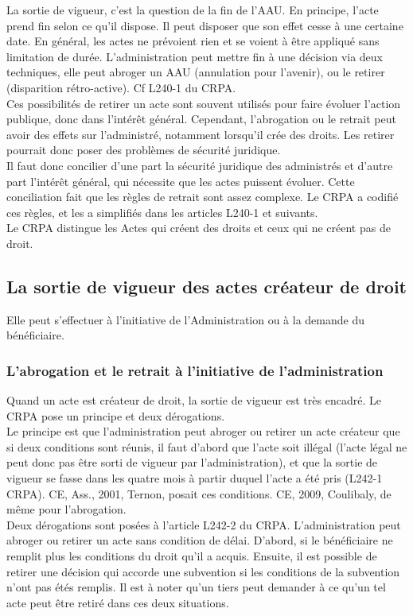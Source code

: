 \documentclass[10pt, a4paper, openany]{book}
\begin{document}
La sortie de vigueur, c'est la question de la fin de l'AAU. En principe, l'acte prend fin selon ce qu'il dispose. Il peut disposer que son effet cesse à une certaine date. En général, les actes ne prévoient rien et se voient à être appliqué sans limitation de durée. L'administration peut mettre fin à une décision via deux techniques, elle peut abroger un AAU (annulation pour l'avenir), ou le retirer (disparition rétro-active). Cf L240-1 du CRPA. \\
Ces possibilités de retirer un acte sont souvent utilisés pour faire évoluer l'action publique, donc dans l'intérêt général. Cependant, l'abrogation ou le retrait peut avoir des effets sur l'administré, notamment lorsqu'il crée des droits. Les retirer pourrait donc poser des problèmes de sécurité juridique. \\
Il faut donc concilier d'une part la sécurité juridique des administrés et d'autre part l'intérêt général, qui nécessite que les actes puissent évoluer. Cette conciliation fait que les règles de retrait sont assez complexe. Le CRPA a codifié ces règles, et les a simplifiés dans les articles L240-1 et suivants. \\
Le CRPA distingue les Actes qui créent des droits et ceux qui ne créent pas de droit.  

\subsection{La sortie de vigueur des actes créateur de droit}

Elle peut s'effectuer à l'initiative de l'Administration ou à la demande du bénéficiaire. 

\subsubsection{L'abrogation et le retrait à l'initiative de l'administration}

Quand un acte est créateur de droit, la sortie de vigueur est très encadré. Le CRPA pose un principe et deux dérogations. \\
Le principe est que l'administration peut abroger ou retirer un acte créateur que si deux conditions sont réunis, il faut d'abord que l'acte soit illégal (l'acte légal ne peut donc pas être sorti de vigueur par l'administration), et que la sortie de vigueur se fasse dans les quatre mois à partir duquel l'acte a été pris (L242-1 CRPA). CE, Ass., 2001, Ternon, posait ces conditions. CE, 2009, Coulibaly, de même pour l'abrogation. \\
Deux dérogations sont posées à l'article L242-2 du CRPA. L'administration peut abroger ou retirer un acte sans condition de délai. D'abord, si le bénéficiaire ne remplit plus les conditions du droit qu'il a acquis. Ensuite, il est possible de retirer une décision qui accorde une subvention si les conditions de la subvention n'ont pas étés remplis. Il est à noter qu'un tiers peut demander à ce qu'un tel acte peut être retiré dans ces deux situations. 
\end{document}
